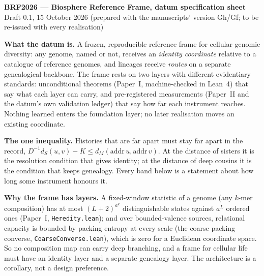 \documentclass[10pt]{article}
\begin{document}
\begin{center}
{\Large\bfseries BRF2026 --- Biosphere Reference Frame, datum specification sheet}\\[2pt]
{\small Draft 0.1, 15 October 2026 (prepared with the manuscripts' version Gh/Gf; to be re-issued with every realisation)}
\end{center}

\textbf{What the datum is.} A frozen, reproducible reference frame for cellular genomic diversity: any genome, named or not, receives an \emph{identity coordinate} relative to a catalogue of reference genomes, and lineages receive \emph{routes} on a separate genealogical backbone. The frame rests on two layers with different evidentiary standards: unconditional theorems (Paper~I, machine-checked in Lean~4) that say what each layer can carry, and pre-registered measurements (Paper~II and the datum's own validation ledger) that say how far each instrument reaches. Nothing learned enters the foundation layer; no later realisation moves an existing coordinate.

\textbf{The one inequality.} Histories that are far apart must stay far apart in the record, $D^{-1}d_S(u,v)-K\le d_M(\mathrm{addr}\,u,\mathrm{addr}\,v)$. At the distance of sisters it is the resolution condition that gives identity; at the distance of deep cousins it is the condition that keeps genealogy. Every band below is a statement about how long some instrument honours it.

\textbf{Why the frame has layers.} A fixed-window statistic of a genome (any $k$-mer composition) has at most $(L+2)^{a^k}$ distinguishable states against $a^L$ ordered ones (Paper~I, \texttt{Heredity.lean}); and over bounded-valence sources, relational capacity is bounded by packing entropy at every scale (the coarse packing converse, \texttt{CoarseConverse.lean}), which is zero for a Euclidean coordinate space. So no composition map can carry deep branching, and a frame for cellular life must have an identity layer and a separate genealogy layer. The architecture is a corollary, not a design preference.
\end{document}
